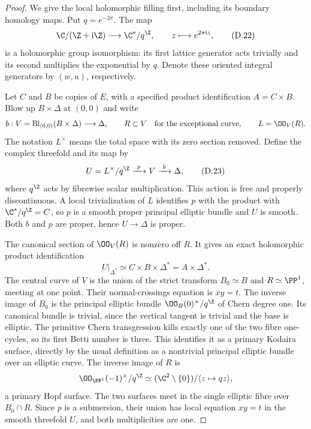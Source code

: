 \begin{proof}
We give the local holomorphic filling first, including its
boundary homology maps. Put $q=e^{-2\pi}$. The map
\[
 \C/(\Z+\mathrm i\Z)\longrightarrow\C^*/q^{\Z},
 \qquad z\longmapsto e^{2\pi\mathrm i z},
\tag{D.22}
\]
is a holomorphic group isomorphism: its first lattice generator
acts trivially and its second multiplies the exponential by
$q$. Denote these oriented integral generators by $(w,u)$,
respectively.

Let $C$ and $B$ be copies of $E$, with a specified product
identification $A=C\times B$. Blow up $B\times\Delta$ at
$(0,0)$ and write
\[
 b:V=\operatorname{Bl}_{(0,0)}(B\times\Delta)\longrightarrow\Delta,
 \qquad R\subset V\quad\hbox{for the exceptional curve},
 \qquad L=\OO_V(R).
\]
The notation $L^\times$ means the total space with its zero
section removed. Define the complex threefold and its map by
\[
 U=L^\times/q^{\Z}\xrightarrow{\ p\ }V\xrightarrow{\ b\ }\Delta,
\tag{D.23}
\]
where $q^{\Z}$ acts by fibrewise scalar multiplication. This
action is free and properly discontinuous. A local
trivialization of $L$ identifies $p$ with the product with
$\C^*/q^{\Z}=C$, so $p$ is a smooth proper principal elliptic
bundle and $U$ is smooth. Both $b$ and $p$ are proper, hence
$U\to\Delta$ is proper.

The canonical section of $\OO_V(R)$ is nonzero off $R$.
It gives an exact holomorphic product identification
\[
 U|_{\Delta^*}\simeq C\times B\times\Delta^*
                         =A\times\Delta^*.
\tag{D.24}
\]
The central curve of $V$ is the union of the strict transform
$B_0\simeq B$ and $R\simeq\PP^1$, meeting at one point.
Their normal-crossings equation is $xy=t$. The inverse image
of $B_0$ is the principal elliptic bundle
$\OO_B(0)^\times/q^{\Z}$ of Chern degree one. Its canonical
bundle is trivial, since the vertical tangent is trivial and
the base is elliptic. The primitive Chern transgression
kills exactly one of the two fibre one-cycles, so its first
Betti number is three. This identifies it as a primary
Kodaira surface, directly by the usual definition as a
nontrivial principal elliptic bundle over an elliptic curve.
The inverse image of $R$ is
\[
 \OO_{\PP^1}(-1)^\times/q^{\Z}
       \simeq(\C^2\setminus\{0\})/\langle z\mapsto qz\rangle,
\]
a primary Hopf surface. The two surfaces meet in the single
elliptic fibre over $B_0\cap R$. Since $p$ is a submersion,
their union has local equation $xy=t$ in the smooth
threefold $U$, and both multiplicities are one.


\end{proof}
